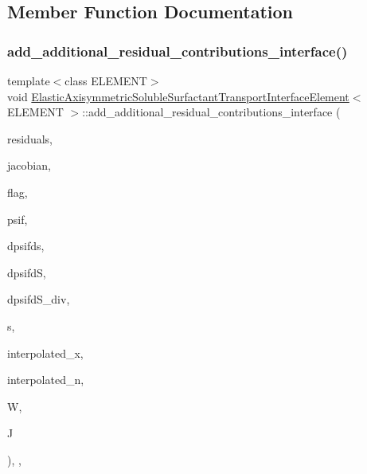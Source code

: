 \subsection{Member Function Documentation}
\mbox{\label{classElasticAxisymmetricSolubleSurfactantTransportInterfaceElement_a054c0dfcc88814e128318c7ad30e6e31}} 
\subsubsection{\texorpdfstring{add\+\_\+additional\+\_\+residual\+\_\+contributions\+\_\+interface()}{add\_additional\_residual\_contributions\_interface()}}
{\footnotesize\ttfamily template$<$class E\+L\+E\+M\+E\+NT$>$ \\
void \hyperlink{classElasticAxisymmetricSolubleSurfactantTransportInterfaceElement}{Elastic\+Axisymmetric\+Soluble\+Surfactant\+Transport\+Interface\+Element}$<$ E\+L\+E\+M\+E\+NT $>$\+::add\+\_\+additional\+\_\+residual\+\_\+contributions\+\_\+interface (\begin{DoxyParamCaption}\item[{Vector$<$ double $>$ \&}]{residuals,  }\item[{Dense\+Matrix$<$ double $>$ \&}]{jacobian,  }\item[{const unsigned \&}]{flag,  }\item[{const Shape \&}]{psif,  }\item[{const D\+Shape \&}]{dpsifds,  }\item[{const D\+Shape \&}]{dpsifdS,  }\item[{const D\+Shape \&}]{dpsifd\+S\+\_\+div,  }\item[{const Vector$<$ double $>$ \&}]{s,  }\item[{const Vector$<$ double $>$ \&}]{interpolated\+\_\+x,  }\item[{const Vector$<$ double $>$ \&}]{interpolated\+\_\+n,  }\item[{const double \&}]{W,  }\item[{const double \&}]{J }\end{DoxyParamCaption})\hspace{0.3cm}{\ttfamily [inline]}, {\ttfamily [protected]}, {\ttfamily [virtual]}}



